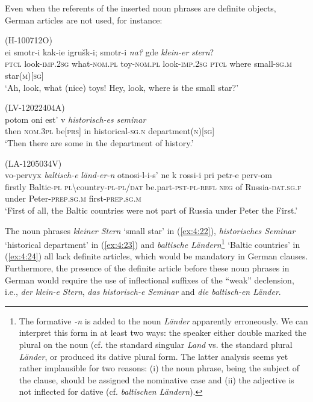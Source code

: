 \noindent Even when the referents of the inserted noun phrases are definite objects, German articles are not used, for instance:

\ea
\label{ex:4:22}
(H-100712O)\\
\gll ei  smotr-i kak-ie igrušk-i; smotr-i \textit{na?}  gde \textit{klein-er} \textit{stern}?\\
 \textsc{ptcl} look-\textsc{imp.2sg} what-\textsc{nom.pl} toy-\textsc{nom.pl} look-\textsc{imp.2sg} \textsc{ptcl} where small-\textsc{sg.m} star(\textsc{m})[\textsc{sg}]\\
\glt `Ah, look, what (nice) toys! Hey, look, where is the small star?'
\z

\ea
\label{ex:4:23}
(LV-12022404A)\\
\gll potom oni est' v \textit{historisch-es} \textit{seminar}\\
 then \textsc{nom.3pl} be[\textsc{prs}] in historical-\textsc{sg.n} department(\textsc{n})[\textsc{sg}]\\
\glt `Then there are some in the department of history.'

\z

\ea
\label{ex:4:24}
(LA-1205034V)\\
 \gll vo-pervyx \textit{baltisch-e} \textit{länd-er-n}  otnosi-l-i-s' ne k rossi-i pri petr-e perv-om\\
 firstly Baltic-\textsc{pl} \textsc{pl}\textbackslash{}country-\textsc{pl-pl/dat} be.part-\textsc{pst-pl-refl} \textsc{neg} of Russia-\textsc{dat.sg.f} under Peter-\textsc{prep.sg.m} first-\textsc{prep.sg.m}\\
\glt `First of all, the Baltic countries were not part of Russia under Peter the First.'

\z

\noindent The noun phrases \textit{kleiner Stern} `small star' in (\ref{ex:4:22}), \textit{historisches Seminar} `historical department' in (\ref{ex:4:23}) and \textit{baltische Ländern}\footnote{The formative \textit {-n} is added to the noun \textit{Länder} apparently erroneously. We can interpret this form in at least two ways: the speaker either double marked the plural on the noun (cf. the standard singular \textit{Land} vs. the standard plural \textit{Länder}, or produced its dative plural form. The latter analysis seems yet rather implausible for two reasons: (i) the noun phrase, being the subject of the clause, should be assigned the nominative case and (ii) the adjective is not inflected for dative  (cf. \textit{baltischen Ländern}).} `Baltic countries' in (\ref{ex:4:24}) all lack definite articles, which would be mandatory in German clauses. Furthermore, the presence of the definite article before these noun phrases in German would require the use of inflectional suffixes of the ``weak'' declension, i.e., \textit{der klein-e Stern}, \textit{das historisch-e Seminar} and \textit{die baltisch-en Länder}. 

